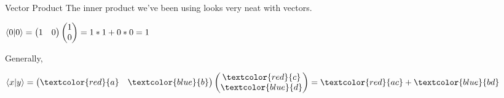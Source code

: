 \documentclass{beamer}
\begin{document}
\begin{frame}{Vector Product}
    The inner product we've been using looks very neat with vectors.

    \begin{center}
        \begin{math}
            \braket{0}{0} = 
            \begin{pmatrix}
                1 & 0
            \end{pmatrix}
            \begin{pmatrix}
                1 \\ 0
            \end{pmatrix}
            = 1*1 + 0*0 = 1
        \end{math}
    \end{center}
    Generally, 
    \begin{center}
        \begin{math}
            \braket{x}{y}=
            \begin{pmatrix}
                \textcolor{red}{a} & \textcolor{blue}{b}
            \end{pmatrix}
            \begin{pmatrix}
                \textcolor{red}{c} \\ \textcolor{blue}{d}
            \end{pmatrix}
            =  \textcolor{red}{ac} + \textcolor{blue}{bd}
        \end{math}
    \end{center}
\end{frame}
\end{document}
